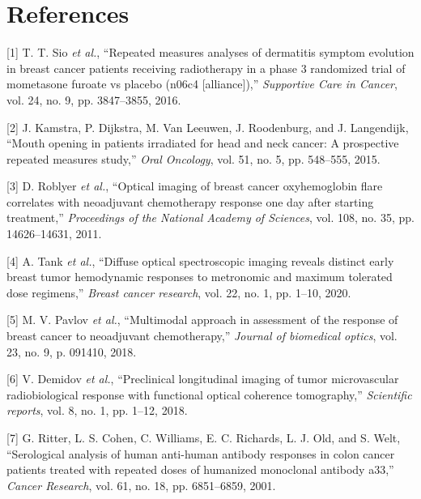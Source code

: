 \documentclass[
]{article}
\begin{document}
\hypertarget{references}{%
\section*{References}\label{references}}

\hypertarget{refs}{}
\leavevmode\hypertarget{ref-sio2016}{}%
{[}1{]} T. T. Sio \emph{et al.}, ``Repeated measures analyses of
dermatitis symptom evolution in breast cancer patients receiving
radiotherapy in a phase 3 randomized trial of mometasone furoate vs
placebo (n06c4 {[}alliance{]}),'' \emph{Supportive Care in Cancer}, vol.
24, no. 9, pp. 3847--3855, 2016.

\leavevmode\hypertarget{ref-kamstra2015}{}%
{[}2{]} J. Kamstra, P. Dijkstra, M. Van Leeuwen, J. Roodenburg, and J.
Langendijk, ``Mouth opening in patients irradiated for head and neck
cancer: A prospective repeated measures study,'' \emph{Oral Oncology},
vol. 51, no. 5, pp. 548--555, 2015.

\leavevmode\hypertarget{ref-roblyer2011}{}%
{[}3{]} D. Roblyer \emph{et al.}, ``Optical imaging of breast cancer
oxyhemoglobin flare correlates with neoadjuvant chemotherapy response
one day after starting treatment,'' \emph{Proceedings of the National
Academy of Sciences}, vol. 108, no. 35, pp. 14626--14631, 2011.

\leavevmode\hypertarget{ref-tank2020}{}%
{[}4{]} A. Tank \emph{et al.}, ``Diffuse optical spectroscopic imaging
reveals distinct early breast tumor hemodynamic responses to metronomic
and maximum tolerated dose regimens,'' \emph{Breast cancer research},
vol. 22, no. 1, pp. 1--10, 2020.

\leavevmode\hypertarget{ref-pavlov2018}{}%
{[}5{]} M. V. Pavlov \emph{et al.}, ``Multimodal approach in assessment
of the response of breast cancer to neoadjuvant chemotherapy,''
\emph{Journal of biomedical optics}, vol. 23, no. 9, p. 091410, 2018.

\leavevmode\hypertarget{ref-demidov2018}{}%
{[}6{]} V. Demidov \emph{et al.}, ``Preclinical longitudinal imaging of
tumor microvascular radiobiological response with functional optical
coherence tomography,'' \emph{Scientific reports}, vol. 8, no. 1, pp.
1--12, 2018.

\leavevmode\hypertarget{ref-ritter2001}{}%
{[}7{]} G. Ritter, L. S. Cohen, C. Williams, E. C. Richards, L. J. Old,
and S. Welt, ``Serological analysis of human anti-human antibody
responses in colon cancer patients treated with repeated doses of
humanized monoclonal antibody a33,'' \emph{Cancer Research}, vol. 61,
no. 18, pp. 6851--6859, 2001.
\end{document}
